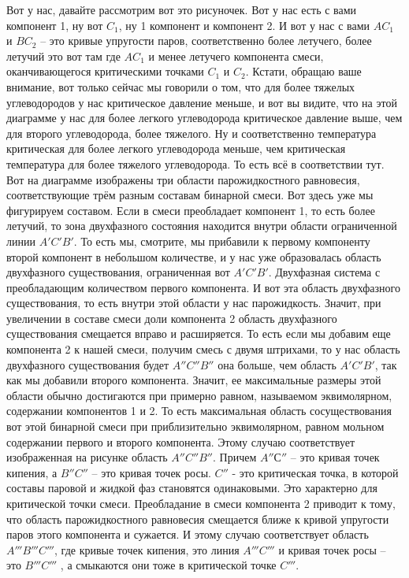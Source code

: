 \documentclass[main.tex]{subfiles}
\begin{document}
Вот у нас, давайте рассмотрим вот это рисуночек.
Вот у нас есть с вами компонент 1, ну вот $C_1$, ну 1 компонент и компонент 2.
И вот у нас с вами $AC_1$ и $BC_2$ -- это кривые упругости паров, соответственно более летучего, более летучий это вот там где $AC_1$ и менее летучего компонента смеси, оканчивающегося критическими точками $C_1$ и $C_2$.
Кстати, обращаю ваше внимание, вот только сейчас мы говорили о том, что для более тяжелых углеводородов у нас критическое давление меньше, и вот вы видите, что на этой диаграмме у нас для более легкого углеводорода критическое давление выше, чем для второго углеводорода, более тяжелого.
Ну и соответственно температура критическая для более легкого углеводорода меньше, чем критическая температура для более тяжелого углеводорода.
То есть всё в соответствии тут.
Вот на диаграмме изображены три области парожидкостного равновесия, соответствующие трём разным составам бинарной смеси.
Вот здесь уже мы фигурируем составом.
Если в смеси преобладает компонент 1, то есть более летучий, то зона двухфазного состояния находится внутри области ограниченной линии $A' C'B'$.
То есть мы, смотрите, мы прибавили к первому компоненту второй компонент в небольшом количестве, и у нас уже образовалась область двухфазного существования, ограниченная вот $A'C'B'$.
Двухфазная система с преобладающим количеством первого компонента.
И вот эта область двухфазного существования, то есть внутри этой области у нас парожидкость.
Значит, при увеличении в составе смеси доли компонента 2 область двухфазного существования смещается вправо и расширяется.
То есть если мы добавим еще компонента 2 к нашей смеси, получим смесь с двумя штрихами, то у нас область двухфазного существования будет $A''C''B''$ она больше, чем область $A'C'B'$, так как мы добавили второго компонента.
Значит, ее максимальные размеры этой области обычно достигаются при примерно равном, называемом эквимолярном, содержании компонентов 1 и 2.
То есть максимальная область сосуществования вот этой бинарной смеси при приблизительно эквимолярном, равном мольном содержании первого и второго компонента.
Этому случаю соответствует изображенная на рисунке область $A''C''B''$. Причем $A''С''$ -- это кривая точек кипения, а $B''C''$ -- это кривая точек росы.
$C''$ - это критическая точка, в которой составы паровой и жидкой фаз становятся одинаковыми.
Это характерно для критической точки смеси.
Преобладание в смеси компонента 2 приводит к тому, что область парожидкостного равновесия смещается ближе к кривой упругости паров этого компонента и сужается.
И этому случаю соответствует область $A'''B'''C'''$, где кривые точек кипения, это линия $A'''C'''$ и кривая точек росы -- это $B'''C'''$ , а смыкаются они тоже в критической точке $C'''$.
\end{document}
